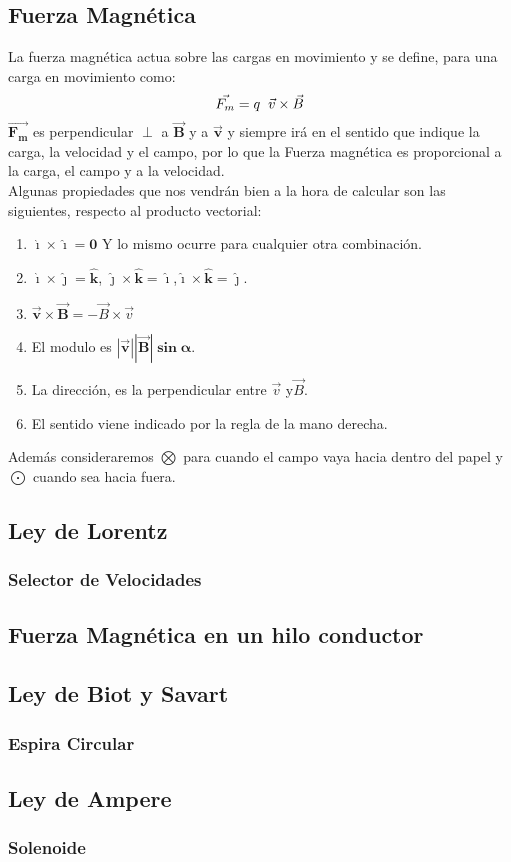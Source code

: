 \subsection{Fuerza Magnética}
\newline
\noindent La fuerza magnética actua sobre las cargas en movimiento y se define, para una carga en movimiento como:
\[
        \vec{F_m} = q\hspace{2mm} \vec{v} \times \vec{B}
\]
\noindent \(\bm{\vec{F_m}}\) es perpendicular \(\bm{\perp}\) a \(\bm{\vec{B}}\) y a \(\bm{\vec{v}}\) y siempre irá en el sentido que indique la carga, la velocidad y el campo, por lo que la Fuerza magnética es proporcional a la carga, el campo y a la velocidad.
\\
Algunas propiedades que nos vendrán bien a la hora de calcular son las siguientes, respecto al producto vectorial:
\begin{enumerate}
        \item \(\bm{\hat{\imath} \times \hat{\imath} = 0}\) Y lo mismo ocurre para cualquier otra combinación.
        \item \(\bm{\hat{\imath}\times \hat{\jmath} = \hat{k}}\), \(\bm{\hat{\jmath}\times\hat{k}=\hat{\imath}}\),\(\bm{\hat{\imath}\times\hat{k}=\hat{\jmath}}\).
        \item \(\bm{\vec{v} \times \vec{B}} = - \vec{B} \times \vec{v}\)
        \item El modulo es \(\bm{\left | \vec{v} \right |\left | \vec{B} \right |\sin{\alpha}}\).
        \item La dirección, es la perpendicular entre \(\vec{v}\) y\(\vec{B}\).
        \item El sentido viene indicado por la regla de la mano derecha.
\end{enumerate}
Además consideraremos \(\bm{\bigotimes}\) para cuando el campo vaya hacia dentro del papel y \(\bm{\bigodot}\) cuando sea hacia fuera.
\subsection{Ley de Lorentz}
\subsubsection{Selector de Velocidades}
\subsection{Fuerza Magnética en un hilo conductor}
\subsection{Ley de Biot y Savart}
\subsubsection{Espira Circular}
\subsection{Ley de Ampere}
\subsubsection{Solenoide }